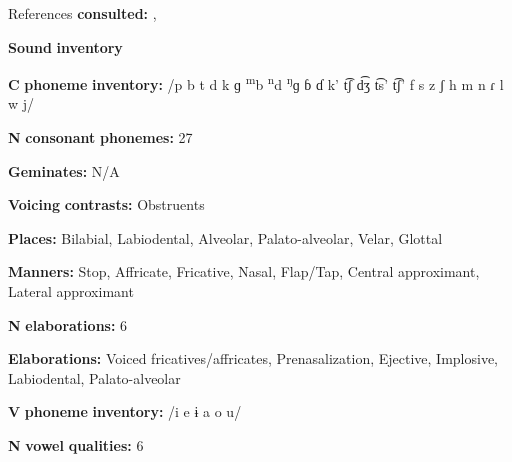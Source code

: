 \begin{styleBody}
References \textbf{consulted:} \citet{Allison2012}, \citet{Mahamat2005}
\end{styleBody}

\begin{styleBody}
\textbf{Sound} \textbf{inventory}
\end{styleBody}

\begin{styleBody}
\textbf{C} \textbf{phoneme} \textbf{inventory:} /p b t d k ɡ \textsuperscript{m}b \textsuperscript{n}d \textsuperscript{ŋ}ɡ ɓ ɗ k’ t͡ʃ d͡ʒ t͡s’ t͡ʃ’ f s z ʃ h m n ɾ l w j/
\end{styleBody}

\begin{styleBody}
\textbf{N} \textbf{consonant} \textbf{phonemes:} 27
\end{styleBody}

\begin{styleBody}
\textbf{Geminates:} N/A
\end{styleBody}

\begin{styleBody}
\textbf{Voicing} \textbf{contrasts:} Obstruents
\end{styleBody}

\begin{styleBody}
\textbf{Places:} Bilabial, Labiodental, Alveolar, Palato-alveolar, Velar, Glottal
\end{styleBody}

\begin{styleBody}
\textbf{Manners:} Stop, Affricate, Fricative, Nasal, Flap/Tap, Central approximant, Lateral approximant
\end{styleBody}

\begin{styleBody}
\textbf{N} \textbf{elaborations:} 6
\end{styleBody}

\begin{styleBody}
\textbf{Elaborations:} Voiced fricatives/affricates, Prenasalization, Ejective, Implosive, Labiodental, Palato-alveolar
\end{styleBody}

\begin{styleBody}
\textbf{V} \textbf{phoneme} \textbf{inventory:} /i e ɨ a o u/
\end{styleBody}

\begin{styleBody}
\textbf{N} \textbf{vowel} \textbf{qualities:} 6
\end{styleBody}

